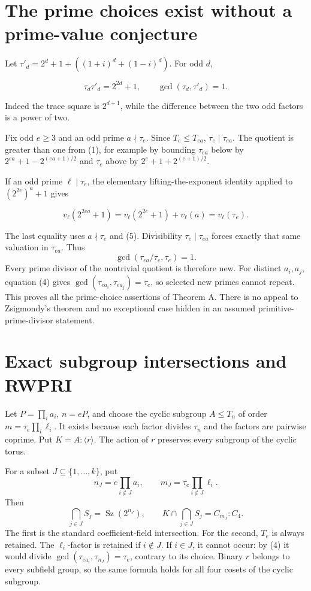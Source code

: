 \documentclass[11pt,a4paper]{article}
\begin{document}
\section{The prime choices exist without a prime-value
conjecture}\label{the-prime-choices-exist-without-a-prime-value-conjecture}

Let \(\tau'_d=2^d+1+((1+i)^d+(1-i)^d)\). For odd \(d\),

\[
\tau_d\tau'_d=2^{2d}+1,\qquad
\gcd(\tau_d,\tau'_d)=1.
\tag{5}
\]

Indeed the trace square is \(2^{d+1}\), while the difference between the
two odd factors is a power of two.

Fix odd \(e\ge3\) and an odd prime \(a\nmid\tau_e\). Since
\(T_e\le T_{ea}\), \(\tau_e\mid\tau_{ea}\). The quotient is greater than
one from (1), for example by bounding \(\tau_{ea}\) below by
\(2^{ea}+1-2^{(ea+1)/2}\) and \(\tau_e\) above by \(2^e+1+2^{(e+1)/2}\).

If an odd prime \(\ell\mid\tau_e\), the elementary lifting-the-exponent
identity applied to \((2^{2e})^a+1\) gives

\[
v_\ell(2^{2ea}+1)=v_\ell(2^{2e}+1)+v_\ell(a)
=v_\ell(\tau_e).
\]

The last equality uses \(a\nmid\tau_e\) and (5). Divisibility
\(\tau_e\mid\tau_{ea}\) forces exactly that same valuation in
\(\tau_{ea}\). Thus \[
\gcd(\tau_{ea}/\tau_e,\tau_e)=1.
\] Every prime divisor of the nontrivial quotient is therefore new. For
distinct \(a_i,a_j\), equation (4) gives
\(\gcd(\tau_{ea_i},\tau_{ea_j})=\tau_e\), so selected new primes cannot
repeat. This proves all the prime-choice assertions of Theorem A. There
is no appeal to Zsigmondy's theorem and no exceptional case hidden in an
assumed primitive-prime-divisor statement.

\section{Exact subgroup intersections and
RWPRI}\label{exact-subgroup-intersections-and-rwpri}

Let \(P=\prod_i a_i\), \(n=eP\), and choose the cyclic subgroup
\(A\le T_n\) of order \(m=\tau_e\prod_i\ell_i\). It exists because each
factor divides \(\tau_n\) and the factors are pairwise coprime. Put
\(K=A:\langle r\rangle\). The action of \(r\) preserves every subgroup
of the cyclic torus.

For a subset \(J\subseteq\{1,\ldots,k\}\), put \[
n_J=e\prod_{i\notin J}a_i,\qquad
m_J=\tau_e\prod_{i\notin J}\ell_i.
\] Then \[
\bigcap_{j\in J}S_j=\operatorname{Sz}(2^{n_J}),\qquad
K\cap\bigcap_{j\in J}S_j=C_{m_J}:C_4.
\tag{6}
\] The first is the standard coefficient-field intersection. For the
second, \(T_e\) is always retained. The \(\ell_i\)-factor is retained if
\(i\notin J\). If \(i\in J\), it cannot occur: by (4) it would divide
\(\gcd(\tau_{ea_i},\tau_{n_J})=\tau_e\), contrary to its choice. Binary
\(r\) belongs to every subfield group, so the same formula holds for all
four cosets of the cyclic subgroup.
\end{document}
